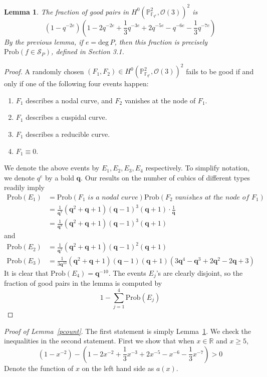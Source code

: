 \documentclass[12pt]{article}
\theoremstyle{plain}
\newtheorem{lemma}[equation]{Lemma}
\theoremstyle{definition}
\newcommand{\IF}{\mathbb{F}}
\newcommand{\IP}{\mathbb{P}}
\newcommand{\sO}{\mathcal{O}}
\newcommand{\sS}{\mathcal{S}}
\renewcommand{\deg}{\mathrm{deg}\,}
\newcommand{\<}{\langle}
\renewcommand{\>}{\rangle}
\newcommand{\Prob}{\mathrm{Prob}}
\begin{document}
\begin{lemma}
\label{prepcount}
The fraction of good pairs in $H^0(\IP^2_{\IF_{q^e}}, \sO(3))^2$ is $$(1 - q^{-2e})(1 - 2q^{-2e} + \frac{1}{3} q^{-3e} + 2 q^{-5e} - q^{-6e} - \frac{1}{3} q^{-7e}) $$ 
By the previous lemma, if $e = \deg P$, then this fraction is precisely $\Prob(f \in \sS_P)$, defined in Section 3.1.
\end{lemma}
\begin{proof}
A randomly chosen $(F_1, F_2) \in H^0(\IP^2_{\IF_{q^e}}, \sO(3))^2$ fails to be good if and only if one of the following four events happen:
\begin{enumerate}
\item $F_1$ describes a nodal curve, and $F_2$ vanishes at the node of $F_1$. 
\item $F_1$ describes a cuspidal curve. 
\item $F_1$ describes a reducible curve. 
\item $F_1 \equiv 0$. 
\end{enumerate} 
We denote the above events by $E_1, E_2, E_3, E_4$ respectively. To simplify notation, we denote $q^e$ by a bold $\pmb{q}$. Our results on the number of cubics of different types readily imply 
\begin{align*}
\Prob(E_1) &= \Prob(F_1 \textit{ is a nodal curve})\Prob(F_2 \textit{ vanishes at the node of } F_1) \\
&= \frac{1}{\pmb{q}^7}(\pmb{q}^2 + \pmb{q} + 1) (\pmb{q} - 1)^3 (\pmb{q} + 1) \cdot \frac{1}{\pmb{q}} \\
&= \frac{1}{\pmb{q}^8}(\pmb{q}^2 + \pmb{q} + 1) (\pmb{q} - 1)^3 (\pmb{q} + 1)
\end{align*}
and 
\begin{align*}
\Prob(E_2) &= \frac{1}{\pmb{q}^7} (\pmb{q}^2 + \pmb{q} + 1) (\pmb{q} - 1)^2 (\pmb{q} + 1)\\
\Prob(E_3) &= \frac{1}{3\pmb{q}^{10}}(\pmb{q}^2 + \pmb{q} + 1)(\pmb{q} - 1) (\pmb{q} + 1)(3\pmb{q}^4 - \pmb{q}^3 + 2 \pmb{q}^2 - 2\pmb{q} + 3)
\end{align*}
It is clear that $\Prob(E_4) = \pmb{q}^{-10}$. The events $E_j$'s are clearly disjoint, so the fraction of good pairs in the lemma is computed by 
$$ 1 - \sum_{j = 1}^4 \Prob(E_j) $$
\end{proof}

\noindent \textit{Proof of Lemma~\ref{pcount}}. The first statement is simply Lemma~\ref{prepcount}. We check the inequalities in the second statement. First we show that when $x \in \mathbb{R}$ and $x \ge 5 $, 
$$ (1 - x^{-2}) - (1 - 2 x^{-2} + \frac{1}{3} x^{-3} + 2 x^{-5} - x^{-6} - \frac{1}{3} x^{-7}) > 0 $$ 
Denote the function of $x$ on the left hand side as $a(x)$. 
\end{document}
